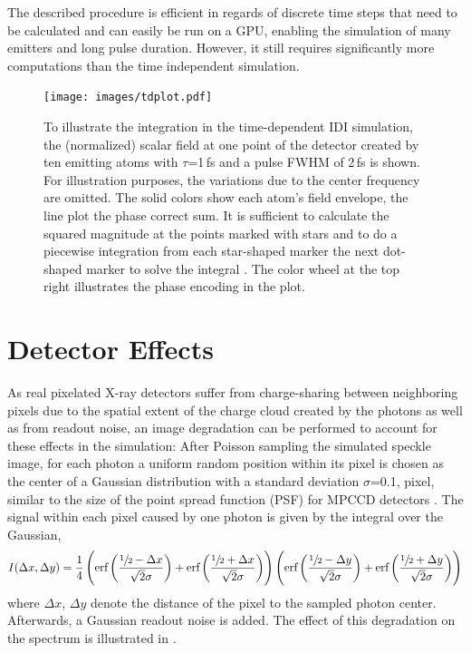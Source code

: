 The described procedure is efficient in regards of discrete time steps that need to be calculated and can easily be run on a GPU, enabling the simulation of many emitters and long pulse duration. However, it still requires significantly more computations than the time independent simulation.
\clearpage
\begin{figure}
	\centering
	\texttt{[image: images/tdplot.pdf]}
	\caption[Integration in time0dependent IDI simulation]{To illustrate the integration in the time-dependent IDI simulation, the (normalized) scalar field at one point of the detector created by ten emitting atoms with $\tau$=1\,fs and a pulse FWHM of 2\,fs is shown. For illustration purposes, the variations due to the center frequency are omitted. The solid colors show each atom's field envelope, the line plot the phase correct sum. It is sufficient to calculate the squared magnitude at the points marked with stars and to do a piecewise integration from each star-shaped marker the next dot-shaped marker to solve the integral . The color wheel at the top right illustrates the phase encoding in the plot.}
	\label{fig:tdplot}
\end{figure}

\section{Detector Effects}
\label{sec:chargesharing}
As real pixelated X-ray detectors suffer from charge-sharing between neighboring pixels due to the spatial extent of the charge cloud created by the photons as well as from readout noise, an image degradation can be performed to account for these effects in the simulation: After Poisson sampling the simulated speckle image, for each photon a uniform random position within its pixel is chosen as the center of a Gaussian distribution with a  standard deviation $\sigma$=0.1, pixel, similar to the size of the point spread function (PSF) for MPCCD detectors \cite{mpccd}.
The signal within each pixel caused by one photon is given by the integral over the Gaussian,
\begin{equation*}
	I(\Delta x,\Delta y)=\frac{1}{4} \left(\text{erf}\left(\frac{\sfrac{1}{2}-\Delta x}{\sqrt{2}
		\sigma}\right)+\text{erf}\left(\frac{\sfrac{1}{2}+\Delta x}{\sqrt{2} \sigma}\right)\right) \left(\text{erf}\left(\frac{\sfrac{1}{2}-\Delta y}{\sqrt{2}
		\sigma}\right)+\text{erf}\left(\frac{\sfrac{1}{2}+\Delta y}{\sqrt{2} \sigma}\right)\right)
\end{equation*}
 where $\Delta x$, $\Delta y$ denote the distance of the pixel to the sampled photon center. Afterwards, a Gaussian readout noise is added. The effect of this degradation on the spectrum is illustrated in .

